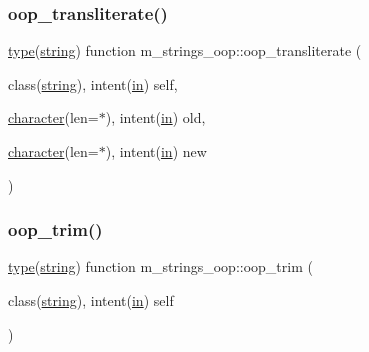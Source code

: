 \subsubsection{\texorpdfstring{oop\+\_\+transliterate()}{oop\_transliterate()}}
{\footnotesize\ttfamily \hyperlink{stop__watch_83_8txt_a70f0ead91c32e25323c03265aa302c1c}{type}(\hyperlink{structm__strings__oop_1_1string}{string}) function m\+\_\+strings\+\_\+oop\+::oop\+\_\+transliterate (\begin{DoxyParamCaption}\item[{class(\hyperlink{structm__strings__oop_1_1string}{string}), intent(\hyperlink{M__journal_83_8txt_afce72651d1eed785a2132bee863b2f38}{in})}]{self,  }\item[{\hyperlink{option__stopwatch_83_8txt_abd4b21fbbd175834027b5224bfe97e66}{character}(len=$\ast$), intent(\hyperlink{M__journal_83_8txt_afce72651d1eed785a2132bee863b2f38}{in})}]{old,  }\item[{\hyperlink{option__stopwatch_83_8txt_abd4b21fbbd175834027b5224bfe97e66}{character}(len=$\ast$), intent(\hyperlink{M__journal_83_8txt_afce72651d1eed785a2132bee863b2f38}{in})}]{new }\end{DoxyParamCaption})\hspace{0.3cm}{\ttfamily [private]}}

\mbox{\label{namespacem__strings__oop_ab9238801d6c3af2fe7ee81c8d2c514ff}} 
\subsubsection{\texorpdfstring{oop\+\_\+trim()}{oop\_trim()}}
{\footnotesize\ttfamily \hyperlink{stop__watch_83_8txt_a70f0ead91c32e25323c03265aa302c1c}{type}(\hyperlink{structm__strings__oop_1_1string}{string}) function m\+\_\+strings\+\_\+oop\+::oop\+\_\+trim (\begin{DoxyParamCaption}\item[{class(\hyperlink{structm__strings__oop_1_1string}{string}), intent(\hyperlink{M__journal_83_8txt_afce72651d1eed785a2132bee863b2f38}{in})}]{self }\end{DoxyParamCaption})\hspace{0.3cm}{\ttfamily [private]}}

\mbox{\label{namespacem__strings__oop_a9f4030a1ab2c7e2aa71b9d1f2754e67e}} 
